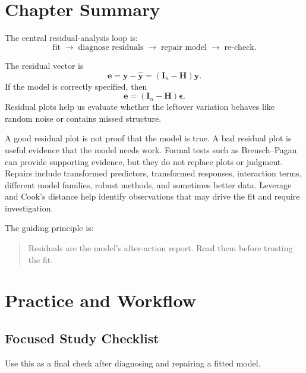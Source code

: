 {\section{Chapter Summary}

The central residual-analysis loop is:
\begin{equation}
  \boxed{
  \text{fit} \;\longrightarrow\; \text{diagnose residuals} \;\longrightarrow\; \text{repair model} \;\longrightarrow\; \text{re-check}.
  }
\end{equation}

The residual vector is
\begin{equation}
  \mathbf{e}=\mathbf{y}-\widehat{\mathbf{y}}=(\mathbf{I}_n-\mathbf{H})\mathbf{y}.
\end{equation}
If the model is correctly specified, then
\begin{equation}
  \mathbf{e}=(\mathbf{I}_n-\mathbf{H})\boldsymbol{\epsilon}.
\end{equation}
Residual plots help us evaluate whether the leftover variation behaves like random noise or contains missed structure.

A good residual plot is not proof that the model is true.  A bad residual plot is useful evidence that the model needs work.  Formal tests such as Breusch--Pagan can provide supporting evidence, but they do not replace plots or judgment.  Repairs include transformed predictors, transformed responses, interaction terms, different model families, robust methods, and sometimes better data.  Leverage and Cook's distance help identify observations that may drive the fit and require investigation.

The guiding principle is:
\begin{quote}
  Residuals are the model's after-action report.  Read them before trusting the fit.
\end{quote}

\section{Practice and Workflow}
\subsection*{Focused Study Checklist}

Use this as a final check after diagnosing and repairing a fitted model.

}
